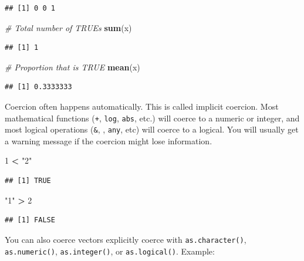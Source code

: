 \documentclass[
]{book}
\newenvironment{Shaded}{\begin{snugshade}}{\end{snugshade}}
\newcommand{\CommentTok}[1]{\textcolor[rgb]{0.56,0.35,0.01}{\textit{#1}}}
\newcommand{\DecValTok}[1]{\textcolor[rgb]{0.00,0.00,0.81}{#1}}
\newcommand{\FunctionTok}[1]{\textcolor[rgb]{0.13,0.29,0.53}{\textbf{#1}}}
\newcommand{\NormalTok}[1]{#1}
\newcommand{\SpecialCharTok}[1]{\textcolor[rgb]{0.81,0.36,0.00}{\textbf{#1}}}
\newcommand{\StringTok}[1]{\textcolor[rgb]{0.31,0.60,0.02}{#1}}
\begin{document}
\begin{verbatim}
## [1] 0 0 1
\end{verbatim}

\begin{Shaded}
\begin{Highlighting}[]
\CommentTok{\# Total number of TRUEs}
\FunctionTok{sum}\NormalTok{(x)}
\end{Highlighting}
\end{Shaded}

\begin{verbatim}
## [1] 1
\end{verbatim}

\begin{Shaded}
\begin{Highlighting}[]
\CommentTok{\# Proportion that is TRUE}
\FunctionTok{mean}\NormalTok{(x)}
\end{Highlighting}
\end{Shaded}

\begin{verbatim}
## [1] 0.3333333
\end{verbatim}

Coercion often happens automatically. This is called implicit coercion. Most mathematical functions (\texttt{+}, \texttt{log}, \texttt{abs}, etc.) will coerce to a numeric or integer, and most logical operations (\texttt{\&}, \texttt{\textbar{}}, \texttt{any}, etc) will coerce to a logical. You will usually get a warning message if the coercion might lose information.

\begin{Shaded}
\begin{Highlighting}[]
\DecValTok{1} \SpecialCharTok{\textless{}} \StringTok{"2"}
\end{Highlighting}
\end{Shaded}

\begin{verbatim}
## [1] TRUE
\end{verbatim}

\begin{Shaded}
\begin{Highlighting}[]
\StringTok{"1"} \SpecialCharTok{\textgreater{}} \DecValTok{2}
\end{Highlighting}
\end{Shaded}

\begin{verbatim}
## [1] FALSE
\end{verbatim}

You can also coerce vectors explicitly coerce with \texttt{as.character()}, \texttt{as.numeric()}, \texttt{as.integer()}, or \texttt{as.logical()}. Example:
\end{document}
